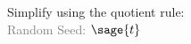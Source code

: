 \documentclass{article}%
\begin{document}
\begin{sagesilent}
{{{{ 
\end{sagesilent}







\noindent Simplify using the quotient rule: \\
\textcolor{gray}{Random Seed: $\sage{t}$}


\begin{enumerate}
\begin{multicols}{3}
\end{multicols}
\end{enumerate}


\newpage


\begin{multicols}{3}
\begin{enumerate}
\end{enumerate}
\end{multicols}
\end{document}
